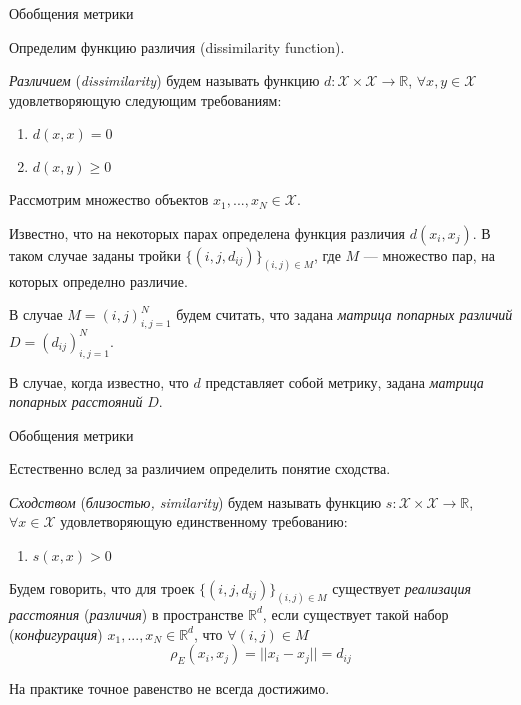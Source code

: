 \documentclass[9pt]{beamer}
\begin{document}
\begin{frame}{Обобщения метрики}

Определим функцию различия (dissimilarity function).

\vspace{\baselineskip}

\textit{Различием} (\textit{dissimilarity}) будем называть функцию $d: \mathcal{X} \times \mathcal{X} \to \mathbb{R}$, $\forall x, y \in \mathcal{X}$ удовлетворяющую следующим требованиям:

\begin{enumerate}[(D1)]
    \item $d(x, x) = 0$
	\item $d(x, y) \geqslant 0$ 
\end{enumerate}
\vspace{\baselineskip}
Рассмотрим множество объектов $x_1, ..., x_N \in \mathcal{X}$. 

Известно, что на некоторых парах определена функция различия $d(x_i, x_j)$. В таком случае заданы тройки $\{(i, j, d_{ij})\}_{(i, j) \in M}$, где $M$ --- множество пар, на которых определно различие. 

\vspace{\baselineskip}

В случае $M = {(i, j)}_{i, j =1}^N$ будем считать, что задана \textit{матрица попарных различий} $D = (d_{ij})_{i,j=1}^N$. 

В случае, когда известно, что $d$ представляет собой метрику, задана \textit{матрица попарных расстояний} $D$.
    
\end{frame}

\begin{frame}{Обобщения метрики}

Естественно вслед за различием определить понятие сходства.

\vspace{\baselineskip}

\textit{Сходством} (\textit{близостью, similarity}) будем называть функцию $s: \mathcal{X} \times \mathcal{X} \to \mathbb{R}$, $\forall x \in \mathcal{X}$ удовлетворяющую единственному требованию:

\begin{enumerate}[(S1)]
    \item $s(x, x) > 0$
\end{enumerate}
\vspace{\baselineskip}

Будем говорить, что для троек $\{(i, j, d_{ij})\}_{(i, j) \in M}$ существует \textit{реализация расстояния} (\textit{различия}) в пространстве $\mathbb{R}^d$, если существует такой набор (\textit{конфигурация}) $x_1, ..., x_N \in \mathbb{R}^d$, что $\forall (i, j) \in M$
\begin{equation}\label{exact}\rho_E(x_i, x_j) = ||x_i - x_j|| = d_{ij} \end{equation}

На практике точное равенство не всегда достижимо.
    
\end{frame}
\end{document}
